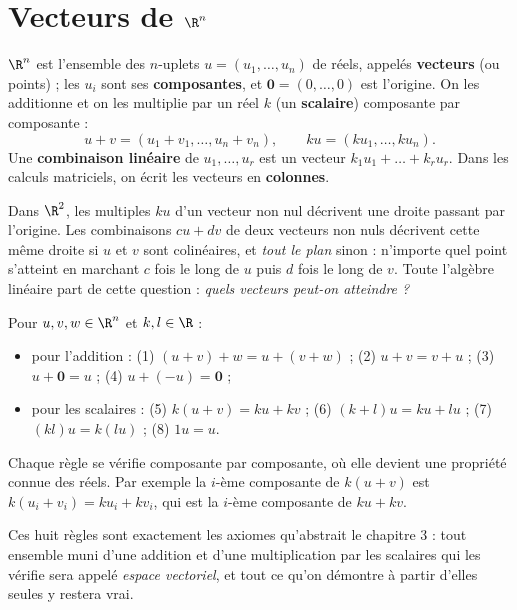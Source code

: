 \section{Vecteurs de $\R^n$}
\begin{definition}[L'espace $\R^n$]
$\R^n$ est l'ensemble des $n$-uplets $u=(u_1,\dots,u_n)$ de réels, appelés \textbf{vecteurs} (ou points) ; les $u_i$ sont ses \textbf{composantes}, et $\mathbf 0=(0,\dots,0)$ est l'origine. On les additionne et on les multiplie par un réel $k$ (un \textbf{scalaire}) composante par composante :
\[u+v=(u_1+v_1,\dots,u_n+v_n),\qquad ku=(ku_1,\dots,ku_n).\]
Une \textbf{combinaison linéaire} de $u_1,\dots,u_r$ est un vecteur $k_1u_1+\dots+k_ru_r$. Dans les calculs matriciels, on écrit les vecteurs en \textbf{colonnes}.
\end{definition}
\begin{intuition}
Dans $\R^2$, les multiples $ku$ d'un vecteur non nul décrivent une droite passant par l'origine. Les combinaisons $cu+dv$ de deux vecteurs non nuls décrivent cette même droite si $u$ et $v$ sont colinéaires, et \emph{tout le plan} sinon : n'importe quel point s'atteint en marchant $c$ fois le long de $u$ puis $d$ fois le long de $v$. Toute l'algèbre linéaire part de cette question : \emph{quels vecteurs peut-on atteindre ?}
\end{intuition}
\begin{theoreme}\label{thm-huit}
Pour $u,v,w\in\R^n$ et $k,l\in\R$ :
\begin{itemize}
\item pour l'addition : (1) $(u+v)+w=u+(v+w)$ ; (2) $u+v=v+u$ ; (3) $u+\mathbf 0=u$ ; (4) $u+(-u)=\mathbf 0$ ;
\item pour les scalaires : (5) $k(u+v)=ku+kv$ ; (6) $(k+l)u=ku+lu$ ; (7) $(kl)u=k(lu)$ ; (8) $1u=u$.
\end{itemize}
\end{theoreme}
\begin{preuve}
Chaque règle se vérifie composante par composante, où elle devient une propriété connue des réels. Par exemple la $i$-ème composante de $k(u+v)$ est $k(u_i+v_i)=ku_i+kv_i$, qui est la $i$-ème composante de $ku+kv$.
\end{preuve}
\begin{essentiel}
Ces huit règles sont exactement les axiomes qu'abstrait le chapitre 3 : tout ensemble muni d'une addition et d'une multiplication par les scalaires qui les vérifie sera appelé \emph{espace vectoriel}, et tout ce qu'on démontre à partir d'elles seules y restera vrai.
\end{essentiel}

